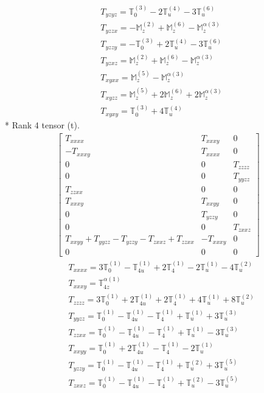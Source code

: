 \documentclass[fleqn,8pt,landscape]{jsarticle}
\begin{document}
\begin{align*}
& T_{yzyz} = \mathbb{T}_{0}^{(3)} - 2 \mathbb{T}_{u}^{(4)} - 3 \mathbb{T}_{u}^{(6)} \\
& T_{yzzx} = - \mathbb{M}_{z}^{(2)} + \mathbb{M}_{z}^{(6)} - \mathbb{M}_{z}^{\alpha(3)} \\
& T_{yzzy} = - \mathbb{T}_{0}^{(3)} + 2 \mathbb{T}_{u}^{(4)} - 3 \mathbb{T}_{u}^{(6)} \\
& T_{yzxz} = \mathbb{M}_{z}^{(2)} + \mathbb{M}_{z}^{(6)} - \mathbb{M}_{z}^{\alpha(3)} \\
& T_{xyxx} = \mathbb{M}_{z}^{(5)} - \mathbb{M}_{z}^{\alpha(3)} \\
& T_{xyzz} = \mathbb{M}_{z}^{(5)} + 2 \mathbb{M}_{z}^{(6)} + 2 \mathbb{M}_{z}^{\alpha(3)} \\
& T_{xyxy} = \mathbb{T}_{0}^{(3)} + 4 \mathbb{T}_{u}^{(4)}
\end{align*}
* Rank 4 tensor (t).
\begin{align*}
\begin{bmatrix} T_{xxxx} & T_{xxxy} & 0 \\ - T_{xxxy} & T_{xxxx} & 0 \\ 0 & 0 & T_{zzzz} \\ 0 & 0 & T_{yyzz} \\ T_{zzxx} & 0 & 0 \\ T_{xxxy} & T_{xxyy} & 0 \\ 0 & T_{yzzy} & 0 \\ 0 & 0 & T_{zxxz} \\ T_{xxyy} + T_{yyzz} - T_{yzzy} - T_{zxxz} + T_{zzxx} & - T_{xxxy} & 0 \\ 0 & 0 & 0 \end{bmatrix}
\end{align*}
\begin{align*}
& T_{xxxx} = 3 \mathbb{T}_{0}^{(1)} - \mathbb{T}_{4u}^{(1)} + 2 \mathbb{T}_{4}^{(1)} - 2 \mathbb{T}_{u}^{(1)} - 4 \mathbb{T}_{u}^{(2)} \\
& T_{xxxy} = \mathbb{T}_{4z}^{\alpha(1)} \\
& T_{zzzz} = 3 \mathbb{T}_{0}^{(1)} + 2 \mathbb{T}_{4u}^{(1)} + 2 \mathbb{T}_{4}^{(1)} + 4 \mathbb{T}_{u}^{(1)} + 8 \mathbb{T}_{u}^{(2)} \\
& T_{yyzz} = \mathbb{T}_{0}^{(1)} - \mathbb{T}_{4u}^{(1)} - \mathbb{T}_{4}^{(1)} + \mathbb{T}_{u}^{(1)} + 3 \mathbb{T}_{u}^{(3)} \\
& T_{zzxx} = \mathbb{T}_{0}^{(1)} - \mathbb{T}_{4u}^{(1)} - \mathbb{T}_{4}^{(1)} + \mathbb{T}_{u}^{(1)} - 3 \mathbb{T}_{u}^{(3)} \\
& T_{xxyy} = \mathbb{T}_{0}^{(1)} + 2 \mathbb{T}_{4u}^{(1)} - \mathbb{T}_{4}^{(1)} - 2 \mathbb{T}_{u}^{(1)} \\
& T_{yzzy} = \mathbb{T}_{0}^{(1)} - \mathbb{T}_{4u}^{(1)} - \mathbb{T}_{4}^{(1)} + \mathbb{T}_{u}^{(2)} + 3 \mathbb{T}_{u}^{(5)} \\
& T_{zxxz} = \mathbb{T}_{0}^{(1)} - \mathbb{T}_{4u}^{(1)} - \mathbb{T}_{4}^{(1)} + \mathbb{T}_{u}^{(2)} - 3 \mathbb{T}_{u}^{(5)}
\end{align*}
\end{document}
